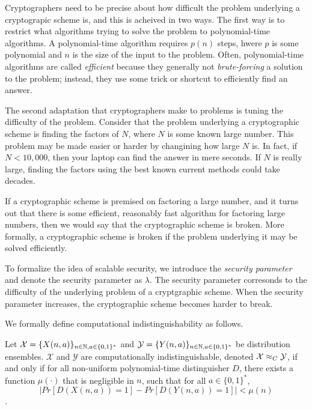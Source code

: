 Cryptographers need to be precise about how difficult the problem underlying a cryptograpic scheme is, and this is acheived in two ways. 
The first way is to restrict what algorithms trying to solve the problem to polynomial-time algorithms.
A polynomial-time algorithm requires $p(n)$ steps, hwere $p$ is some polynomial and $n$ is the size of the input to the problem. 
Often, polynomial-time algorithms are called \textit{efficient} because they generally not \textit{brute-forcing} a solution to the problem; instead, they use some trick or shortcut to efficiently find an answer.

The second adaptation that cryptographers make to problems is tuning the difficulty of the problem. 
Consider that the problem underlying a cryptographic scheme is finding the factors of $N$, where $N$ is some known large number.
This problem may be made easier or harder by changining how large $N$ is. 
In fact, if $N < 10,000$, then your laptop can find the answer in mere seconds. 
If $N$ is really large, finding the factors using the best known current methods could take decades. 

If a cryptographic scheme is premised on factoring a large number, and it turns out that there is some efficient, reasonably fast algorithm for factoring large numbers, then we would say that the cryptographic scheme is broken. 
More formally, a cryptographic scheme is broken if the problem underlying it may be solved efficiently.

To formalize the idea of scalable security, we introduce the \textit{security parameter} and denote the security parameter as $\lambda$. 
The security parameter corresonds to the difficulty of the underlying problem of a cryptgraphic scheme. 
When the security parameter increases, the cryptographic scheme becomes harder to break.



\label{sctn:computational-indistinguishability}
We formally define computational indistinguishability as follows.

\begin{definition}
\label{defn:computational-indistinguishability}
Let $\mathcal{X} = \{X(n,a)\}_{n \in \mathbb{N}, a \in \{0,1\}^*}$ and $\mathcal{Y} = \{Y(n,a)\}_{n \in \mathbb{N}, a \in \{0,1\}^*}$ be distribution ensembles.
$\mathcal{X}$ and $\mathcal{Y}$ are computationally indistinguishable, denoted $\mathcal{X} \approx_C \mathcal{Y}$, if and only if for all non-uniform polynomial-time distinguisher $D$, there exists a function $\mu(\cdot)$ that is negligible in $n$, such that for all $a \in \{0,1\}^*$, 
\begin{equation}
    |Pr[D(X(n,a)) = 1] - Pr[D(Y(n,a)) = 1]| < \mu(n)
\end{equation}
\cite{lindell2009secure}.
\end{definition}

